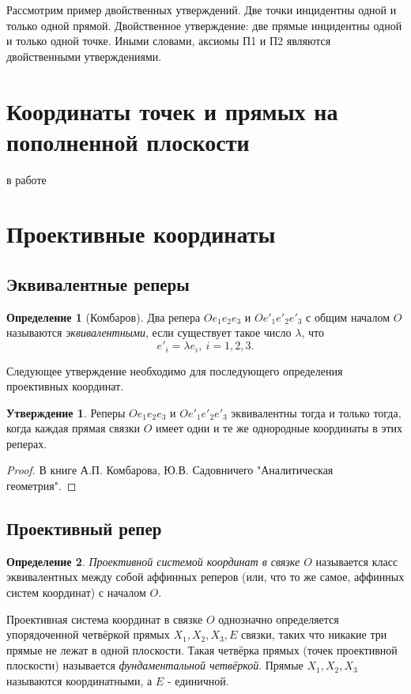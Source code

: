 \documentclass[a4paper, 12pt]{article}
\theoremstyle{definition}
\newtheorem*{definition}{Определение}
\newtheorem*{subtheorem}{Утверждение}
\begin{document}
Рассмотрим пример двойственных утверждений. Две точки инцидентны одной и только одной прямой. Двойственное утверждение: две прямые инцидентны одной и только одной точке. Иными словами, аксиомы П1 и П2 являются двойственными утверждениями.

\section{Координаты точек и прямых на пополненной плоскости}
в работе


\section{Проективные координаты}
\subsection{Эквивалентные реперы}
\begin{definition}[Комбаров]
    Два репера $Oe_1e_2e_3$ и $Oe'_1e'_2e'_3$ с общим началом $O$ называются \textit{эквивалентными}, если существует такое число $\lambda$, что \[e'_i = \lambda e_i, \ i = 1,2,3.\]
\end{definition}

Следующее утверждение необходимо для последующего определения проективных координат.

\begin{subtheorem}
    Реперы $Oe_1e_2e_3$ и $Oe'_1e'_2e'_3$ эквивалентны тогда и только тогда, когда каждая прямая связки $O$ имеет одни и те же однородные координаты в этих реперах.
\end{subtheorem}
\begin{proof}
    В книге А.П. Комбарова, Ю.В. Садовничего "Аналитическая геометрия".
\end{proof}

\subsection{Проективный репер}
\begin{definition}
    \textit{Проективной системой координат в связке $O$} называется класс эквивалентных между собой аффинных реперов (или, что то же самое, аффинных систем координат) с началом $O$.
\end{definition}

Проективная система координат в связке $O$ однозначно определяется упорядоченной четвёркой прямых $X_1, X_2, X_3, E$ связки, таких что никакие три прямые не лежат в одной плоскости. Такая четвёрка прямых (точек проективной плоскости) называется \textit{фундаментальной четвёркой}. Прямые $X_1, X_2, X_3$ называются координатными, а $E$ - единичной.
\end{document}
